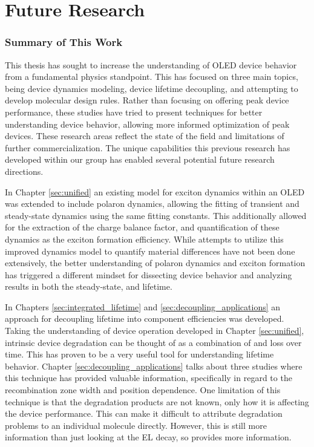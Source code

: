 \documentclass[../thesis.tex]{subfiles}
\begin{document}
\chapter{Future Research}

\subsection{Summary of This Work}

This thesis has sought to increase the understanding of OLED device behavior from a fundamental physics standpoint.
This has focused on three main topics, being device dynamics modeling, device lifetime decoupling, and attempting to develop molecular design rules.
Rather than focusing on offering peak device performance, these studies have tried to present techniques for better understanding device behavior, allowing more informed optimization of peak devices.
These research areas reflect the state of the field and limitations of further commercialization.
The unique capabilities this previous research has developed within our group has enabled several potential future research directions.

In Chapter \ref{sec:unified} an existing model for exciton dynamics within an OLED was extended to include polaron dynamics, allowing the fitting of transient and steady-state dynamics using the same fitting constants.
This additionally allowed for the extraction of the charge balance factor, and quantification of these dynamics as the exciton formation efficiency.
While attempts to utilize this improved dynamics model to quantify material differences have not been done extensively, the better understanding of polaron dynamics and exciton formation has triggered a different mindset for dissecting device behavior and analyzing results in both the steady-state, and lifetime.

In Chapters \ref{sec:integrated_lifetime} and \ref{sec:decoupling_applications} an approach for decoupling lifetime into component efficiencies was developed.  
Taking the understanding of device operation developed in Chapter \ref{sec:unified}, intrinsic device degradation can be thought of as a combination of \pl and \oc loss over time.
This has proven to be a very useful tool for understanding lifetime behavior.  
Chapter \ref{sec:decoupling_applications} talks about three studies where this technique has provided valuable information, specifically in regard to the recombination zone width and position dependence.
One limitation of this technique is that the degradation products are not known, only how it is affecting the device performance.
This can make it difficult to attribute degradation problems to an individual molecule directly.
However, this is still more information than just looking at the EL decay, so provides more information.
\end{document}
